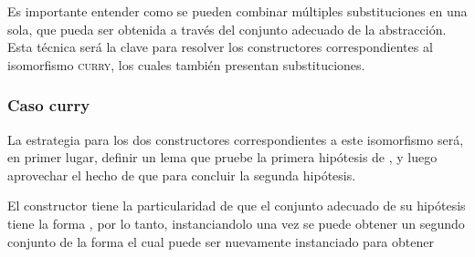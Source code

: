 \documentclass[]{report}
\begin{document}
	Es importante entender como se pueden combinar múltiples substituciones en una sola, que pueda ser obtenida a través del conjunto adecuado de la abstracción.
	Esta técnica será la clave para resolver los constructores correspondientes al isomorfismo \textsc{curry}, los cuales también presentan substituciones.
	
	\subsubsection{Caso curry}
	
	La estrategia para los dos constructores correspondientes a este isomorfismo será, en primer lugar, definir un lema que pruebe la primera hipótesis de , y luego aprovechar el hecho de que
	\AgdaSpace{}%
	\AgdaSpace{}%
	\AgdaSpace{}%
	\AgdaSpace{}%
	\AgdaSpace{}%
	\AgdaSpace{}%
	\AgdaSpace{}%
	\AgdaSpace{}%
	\AgdaSpace{}%
	\AgdaSpace{}%
	para concluir la segunda hipótesis.
	
	El constructor  tiene la particularidad de que el conjunto adecuado de su hipótesis tiene la forma 
	\AgdaSpace{}%
	\AgdaSpace{}%
	\AgdaSpace{}%
	\AgdaSpace{}%
	\AgdaSpace{}%
	, por lo tanto, instanciandolo una vez se puede obtener un segundo conjunto de la forma
	\AgdaSpace{}%
	\AgdaSpace{}%
	\AgdaSymbol{(}\AgdaSpace{}%
	\AgdaSymbol{(}\AgdaSpace{}%
	\AgdaSpace{}%
	\AgdaSymbol{(}\AgdaSpace{}%
	\AgdaSpace{}%
	\AgdaSymbol{))}\AgdaSpace{}%
	\AgdaSpace{}%
	\AgdaSymbol{)}\AgdaSpace{}%
	\AgdaSpace{}%
	el cual puede ser nuevamente instanciado para obtener
	\AgdaSpace{}%
	\AgdaSpace{}%
	\AgdaSpace{}%
	\AgdaSymbol{(}\AgdaSpace{}%
	\AgdaSpace{}%
	\AgdaSymbol{)}\AgdaSpace{}%
	\AgdaSymbol{(}\AgdaSpace{}%
	\AgdaSymbol{(}\AgdaSpace{}%
	\AgdaSpace{}%
	\AgdaSymbol{(}\AgdaSpace{}%
	\AgdaSpace{}%
	\AgdaSymbol{))}\AgdaSpace{}%
	\AgdaSpace{}%
	\AgdaSymbol{)}
	
\end{document}
